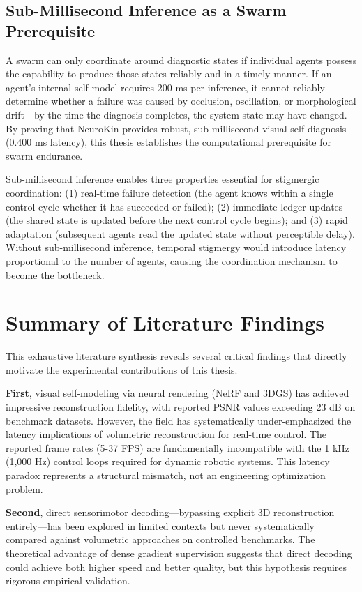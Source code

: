 ﻿\documentclass[12pt,a4paper,oneside]{report}
\begin{document}
\subsection{Sub-Millisecond Inference as a Swarm Prerequisite}

A swarm can only coordinate around diagnostic states if individual agents possess the capability to produce those states reliably and in a timely manner. If an agent's internal self-model requires 200 ms per inference, it cannot reliably determine whether a failure was caused by occlusion, oscillation, or morphological drift---by the time the diagnosis completes, the system state may have changed. By proving that NeuroKin provides robust, sub-millisecond visual self-diagnosis (0.400 ms latency), this thesis establishes the computational prerequisite for swarm endurance.

Sub-millisecond inference enables three properties essential for stigmergic coordination: (1) real-time failure detection (the agent knows within a single control cycle whether it has succeeded or failed); (2) immediate ledger updates (the shared state is updated before the next control cycle begins); and (3) rapid adaptation (subsequent agents read the updated state without perceptible delay). Without sub-millisecond inference, temporal stigmergy would introduce latency proportional to the number of agents, causing the coordination mechanism to become the bottleneck.

\section{Summary of Literature Findings}

This exhaustive literature synthesis reveals several critical findings that directly motivate the experimental contributions of this thesis.

\textbf{First}, visual self-modeling via neural rendering (NeRF and 3DGS) has achieved impressive reconstruction fidelity, with reported PSNR values exceeding 23 dB on benchmark datasets. However, the field has systematically under-emphasized the latency implications of volumetric reconstruction for real-time control. The reported frame rates (5-37 FPS) are fundamentally incompatible with the 1 kHz (1,000 Hz) control loops required for dynamic robotic systems. This latency paradox represents a structural mismatch, not an engineering optimization problem.

\textbf{Second}, direct sensorimotor decoding---bypassing explicit 3D reconstruction entirely---has been explored in limited contexts but never systematically compared against volumetric approaches on controlled benchmarks. The theoretical advantage of dense gradient supervision suggests that direct decoding could achieve both higher speed and better quality, but this hypothesis requires rigorous empirical validation.
\end{document}
